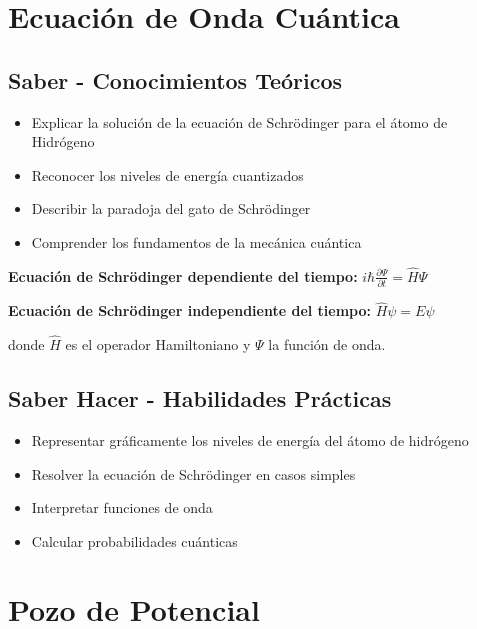 \documentclass[12pt,a4paper,twoside]{book}
\begin{document}
	\section{Ecuación de Onda Cuántica}
	\label{sec:ecuacion_onda}
	
	\subsection{Saber - Conocimientos Teóricos}
	\begin{saberbox}
		\begin{itemize}
			\item Explicar la solución de la ecuación de Schrödinger para el átomo de Hidrógeno
			\item Reconocer los niveles de energía cuantizados
			\item Describir la paradoja del gato de Schrödinger
			\item Comprender los fundamentos de la mecánica cuántica
		\end{itemize}
	\end{saberbox}
	
	\begin{ecuacionbox}
		\textbf{Ecuación de Schrödinger dependiente del tiempo:}
		$i\hbar \frac{\partial \Psi}{\partial t} = \hat{H}\Psi$
		
		\textbf{Ecuación de Schrödinger independiente del tiempo:}
		$\hat{H}\psi = E\psi$
		
		donde $\hat{H}$ es el operador Hamiltoniano y $\Psi$ la función de onda.
	\end{ecuacionbox}
	
	\subsection{Saber Hacer - Habilidades Prácticas}
	\begin{hacerbox}
		\begin{itemize}
			\item Representar gráficamente los niveles de energía del átomo de hidrógeno
			\item Resolver la ecuación de Schrödinger en casos simples
			\item Interpretar funciones de onda
			\item Calcular probabilidades cuánticas
		\end{itemize}
	\end{hacerbox}
	
	\section{Pozo de Potencial}
	\label{sec:pozo_potencial}
	
\end{document}
